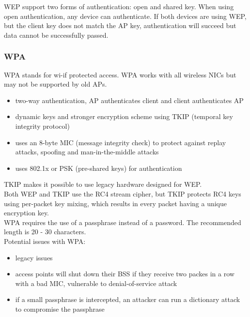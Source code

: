 WEP support two forms of authentication: open and shared key. When using open
authentication, any device can authenticate. If both devices are using WEP,
but the client key does not match the AP key, authentication will succeed but
data cannot be successfully passed.

\subsubsection{WPA}

WPA stands for wi-if protected access. WPA works with all wireless NICs but
may not be supported by old APs.

\begin{itemize}

\item two-way authentication, AP authenticates client and client authenticates
AP
\item dynamic keys and stronger encryption scheme using TKIP (temporal key
integrity protocol)
\item uses an 8-byte MIC (message integrity check) to protect against replay
attacks, spoofing and man-in-the-middle attacks
\item uses 802.1x or PSK (pre-shared keys) for authentication

\end{itemize}

TKIP makes it possible to use legacy hardware designed for WEP.\\

Both WEP and TKIP use the RC4 stream cipher, but TKIP protects RC4 keys using
per-packet key mixing, which results in every packet having a unique encryption
key.\\

WPA requires the use of a passphrase instead of a password. The recommended
length is 20 - 30 characters.\\

Potential issues with WPA:

\begin{itemize}

\item legacy issues
\item access points will shut down their BSS if they receive two packes in a
row with a bad MIC, vulnerable to denial-of-service attack
\item if a small passphrase is intercepted, an attacker can run a dictionary
attack to compromise the passphrase

\end{itemize}

